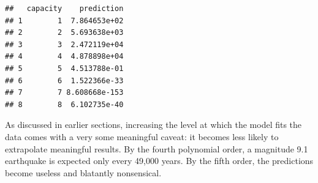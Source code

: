 \begin{Shaded}
\begin{Highlighting}[]
\OtherTok{\textless{}{-}} \SpecialCharTok{:}
\OtherTok{\textless{}{-}} 

\OtherTok{\textless{}{-}} \NormalTok{(}\SpecialCharTok{\textasciitilde{}} 
\OtherTok{\textless{}{-}}  \NormalTok{(} \NormalTok{))}
\OtherTok{\textless{}{-}} \SpecialCharTok{/}\SpecialCharTok{\^{}}
\NormalTok{\}}
\end{Highlighting}
\end{Shaded}

\begin{verbatim}
##   capacity    prediction
## 1        1  7.864653e+02
## 2        2  5.693638e+03
## 3        3  2.472119e+04
## 4        4  4.878898e+04
## 5        5  4.513788e-01
## 6        6  1.522366e-33
## 7        7 8.608668e-153
## 8        8  6.102735e-40
\end{verbatim}

As discussed in earlier sections, increasing the level at which the model fits the data comes with a very some meaningful caveat: it becomes less likely to extrapolate meaningful results.  By the fourth polynomial order, a magnitude 9.1 earthquake is expected only every 49,000 years.  By the fifth order, the predictions become useless and blatantly nonsensical.